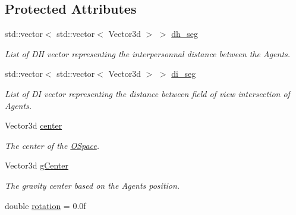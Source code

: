 \subsection*{Protected Attributes}
\begin{DoxyCompactItemize}
\item 
std\+::vector$<$ std\+::vector$<$ Vector3d $>$ $>$ \hyperlink{classOSpace_ada0f8c061d4b2623077c7524a540bb4d}{dh\+\_\+seg}\hypertarget{classOSpace_ada0f8c061d4b2623077c7524a540bb4d}{}\label{classOSpace_ada0f8c061d4b2623077c7524a540bb4d}

\begin{DoxyCompactList}\small\item\em List of DH vector representing the interpersonnal distance between the Agents. \end{DoxyCompactList}\item 
std\+::vector$<$ std\+::vector$<$ Vector3d $>$ $>$ \hyperlink{classOSpace_a6a5fdc339135907855b6a9bc2f69fca7}{di\+\_\+seg}\hypertarget{classOSpace_a6a5fdc339135907855b6a9bc2f69fca7}{}\label{classOSpace_a6a5fdc339135907855b6a9bc2f69fca7}

\begin{DoxyCompactList}\small\item\em List of DI vector representing the distance between field of view intersection of Agents. \end{DoxyCompactList}\item 
Vector3d \hyperlink{classOSpace_a7ec22529d88e51876ff7eba9cdcdca05}{center}\hypertarget{classOSpace_a7ec22529d88e51876ff7eba9cdcdca05}{}\label{classOSpace_a7ec22529d88e51876ff7eba9cdcdca05}

\begin{DoxyCompactList}\small\item\em The center of the \hyperlink{classOSpace}{O\+Space}. \end{DoxyCompactList}\item 
Vector3d \hyperlink{classOSpace_a023a293d79b949534f94eedbac932cec}{g\+Center}\hypertarget{classOSpace_a023a293d79b949534f94eedbac932cec}{}\label{classOSpace_a023a293d79b949534f94eedbac932cec}

\begin{DoxyCompactList}\small\item\em The gravity center based on the Agents position. \end{DoxyCompactList}\item 
double \hyperlink{classOSpace_a0c7df223dae1d6cf274ce9271dfafe8c}{rotation} = 0.\+0f\hypertarget{classOSpace_a0c7df223dae1d6cf274ce9271dfafe8c}{}\label{classOSpace_a0c7df223dae1d6cf274ce9271dfafe8c}


\end{DoxyCompactItemize}
